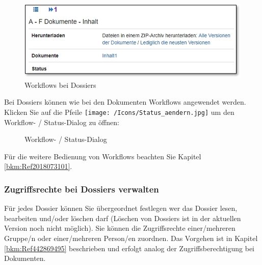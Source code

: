 \begin{figure}
  \vspace{-30pt}
  \begin{center}
    \includegraphics[width=1\linewidth]{../chapters/11_Dokumentenablage/pictures/doss_Workflow.jpg}
  \end{center}
  \vspace{-20pt}
  \caption{Workflows bei Dossiers}
\end{figure}

Bei Dossiers können wie bei den Dokumenten Workflows angewendet werden. Klicken Sie auf die Pfeile \texttt{[image: /Icons/Status\_aendern.jpg]}  um den Workflow- / Status-Dialog zu öffnen:

\vspace{1cm}

\begin{figure}[H]
  \vspace{-5pt}
\caption{Workflow- / Status-Dialog}
\end{figure}

Für die weitere Bedienung von Workflows beachten Sie Kapitel \ref{bkm:Ref2018073101}.

\subsubsection{Zugriffsrechte bei Dossiers verwalten}
\label{bkm:Ref442273510}
Für jedes Dossier können Sie übergeordnet festlegen wer das Dossier lesen, bearbeiten und/oder löschen darf (Löschen von Dossiers ist in der aktuellen Version noch nicht möglich). Sie können die Zugriffsrechte einer/mehreren Gruppe/n oder einer/mehreren Person/en zuordnen. Das Vorgehen ist in Kapitel \ref{bkm:Ref442869495} beschrieben und erfolgt analog der Zugriffsberechtigung bei Dokumenten.

